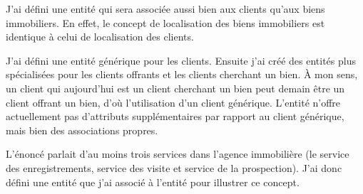 J'ai défini une entité  qui sera associée aussi bien aux clients qu'aux biens immobiliers. En effet, le concept de localisation des biens immobiliers est identique à celui de localisation des clients.

J'ai défini une entité générique pour les clients. Ensuite j'ai créé des entités plus spécialisées pour les clients offrants et les clients cherchant un bien. À mon sens, un client qui aujourd'hui est un client cherchant un bien peut demain être un client offrant un bien, d'où l'utilisation d'un client générique. L'entité  n'offre actuellement pas d'attributs supplémentaires par rapport au client générique, mais bien des associations propres.

L'énoncé parlait d'au moins trois services dans l'agence immobilière (le service des enregistrements, service des visite et service de la prospection). J'ai donc défini une entité  que j'ai associé à l'entité  pour illustrer ce concept.